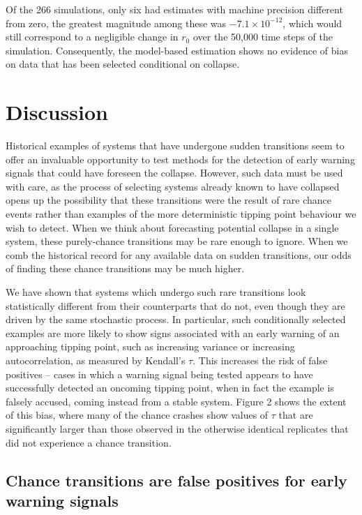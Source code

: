 \documentclass[authoryear,review,12pt]{elsarticle}
\begin{document}
Of the 266 simulations, only six had estimates with machine precision different
from zero, the greatest magnitude among these was $-7.1 \times 10^{-12}$,
which would still correspond to a negligible change in $r_0$ over the 50,000 time steps
of the simulation.  Consequently, the model-based estimation shows no 
evidence of bias on data that has been selected conditional on collapse.   



\section{Discussion}

Historical examples of systems that have undergone sudden transitions seem
to offer an invaluable opportunity to test methods for the detection of
early warning signals that could have foreseen the collapse.  However,
such data must be used with care, as the process of selecting systems
already known to have collapsed opens up the possibility that these
transitions were the result of rare chance events rather than examples
of the more deterministic tipping point behaviour we wish to detect.
When we think about forecasting potential collapse in a single system,
these purely-chance transitions may be rare enough to ignore.  When we
comb the historical record for any available data on sudden transitions,
our odds of finding these chance transitions may be much higher.

We have shown that systems which undergo such rare transitions look
statistically different from their counterparts that do not, even though
they are driven by the same stochastic process.  In particular, such
conditionally selected examples are more likely to show signs associated
with an early warning of an approaching tipping point, such as increasing
variance or increasing autocorrelation, as measured by Kendall's $\tau$.
This increases the risk of false positives -- cases in which a warning
signal being tested appears to have successfully detected an oncoming
tipping point, when in fact the example is falsely accused, coming
instead from a stable system. Figure 2 shows the extent of this bias,
where many of the chance crashes show values of $\tau$ that are 
significantly larger than those observed in the otherwise identical
replicates that did not experience a chance transition.  


\subsection{Chance transitions are false positives for early warning signals}
\end{document}
